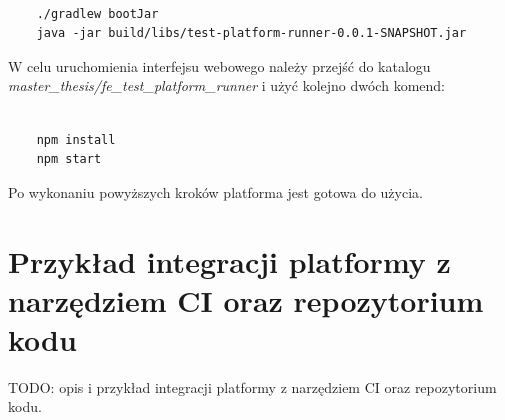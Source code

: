 {\selectfont
\tiny
\begin{lstlisting}

    ./gradlew bootJar
    java -jar build/libs/test-platform-runner-0.0.1-SNAPSHOT.jar

\end{lstlisting}
}

W celu uruchomienia interfejsu webowego należy przejść do katalogu \newline \textit{master\_thesis/fe\_test\_platform\_runner} i użyć kolejno dwóch komend:

{\selectfont
\tiny
\begin{lstlisting}

    npm install
    npm start

\end{lstlisting}
}

Po wykonaniu powyższych kroków platforma jest gotowa do użycia.

\section {Przykład integracji platformy z narzędziem CI oraz repozytorium kodu}
\label{ci-integration}

TODO: opis i przykład integracji platformy z narzędziem CI oraz repozytorium
kodu.